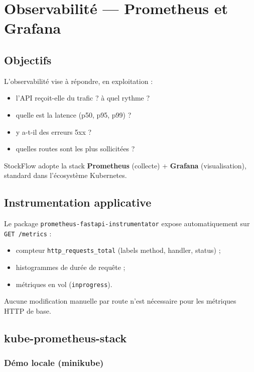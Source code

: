 \chapter{Observabilité — Prometheus et Grafana}
\label{ch:monitoring}

\section{Objectifs}

L'observabilité vise à répondre, en exploitation :
\begin{itemize}
  \item l'API reçoit-elle du trafic ? à quel rythme ?
  \item quelle est la latence (p50, p95, p99) ?
  \item y a-t-il des erreurs 5xx ?
  \item quelles routes sont les plus sollicitées ?
\end{itemize}

StockFlow adopte la stack \textbf{Prometheus} (collecte) + \textbf{Grafana} (visualisation), standard dans l'écosystème Kubernetes.

\section{Instrumentation applicative}

Le package \texttt{prometheus-fastapi-instrumentator} expose automatiquement sur \texttt{GET /metrics} :
\begin{itemize}
  \item compteur \texttt{http\_requests\_total} (labels method, handler, status) ;
  \item histogrammes de durée de requête ;
  \item métriques en vol (\texttt{inprogress}).
\end{itemize}

Aucune modification manuelle par route n'est nécessaire pour les métriques HTTP de base.

\section{kube-prometheus-stack}

\subsection{Démo locale (minikube)}

